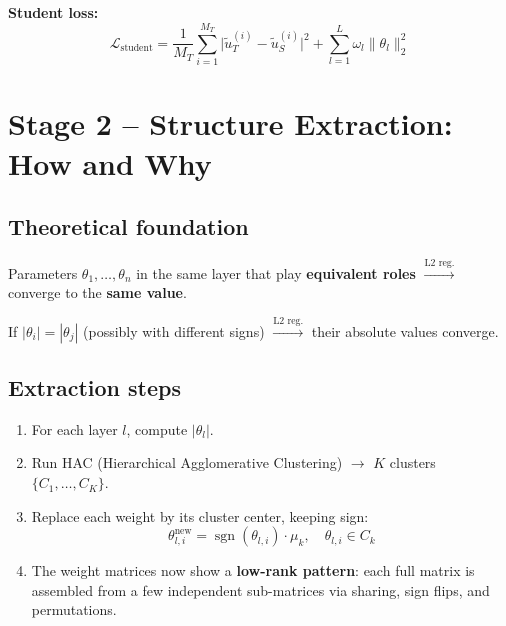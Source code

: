 \documentclass[11pt,a4paper]{article}
\begin{document}
\textbf{Student loss:}
\begin{equation}
\mathcal{L}_{\text{student}} = \frac{1}{M_T}\sum_{i=1}^{M_T} \big|\tilde{u}_T^{(i)} - \tilde{u}_S^{(i)}\big|^2 + \sum_{l=1}^{L} \omega_l \|\theta_l\|_2^2
\end{equation}

\section{Stage 2 -- Structure Extraction: How and Why}

\subsection{Theoretical foundation}

\begin{tcolorbox}[colback=yellow!6,colframe=orange!60!black,title={\small Theorem 1: Equivalent parameters converge}]
\small Parameters $\theta_1,\dots,\theta_n$ in the same layer that play \textbf{equivalent roles} $\xrightarrow{\text{L2 reg.}}$ converge to the \textbf{same value}.
\end{tcolorbox}

\begin{tcolorbox}[colback=yellow!6,colframe=orange!60!black,title={\small Theorem 2: Symmetric parameters converge in absolute value}]
\small If $|\theta_i|=|\theta_j|$ (possibly with different signs) $\xrightarrow{\text{L2 reg.}}$ their absolute values converge.
\end{tcolorbox}

\subsection{Extraction steps}

\begin{enumerate}[leftmargin=1.8em,itemsep=2pt]
\item For each layer $l$, compute $|\theta_l|$.
\item Run HAC (Hierarchical Agglomerative Clustering) $\longrightarrow$ $K$ clusters $\{C_1,\dots,C_K\}$.
\item Replace each weight by its cluster center, keeping sign:
\begin{equation}
    \theta_{l,i}^{\text{new}} = \operatorname{sgn}(\theta_{l,i})\cdot\mu_k, \quad \theta_{l,i}\in C_k
\end{equation}
\item The weight matrices now show a \textbf{low-rank pattern}: each full matrix is assembled from a few independent sub-matrices via sharing, sign flips, and permutations.
\end{enumerate}
\end{document}
